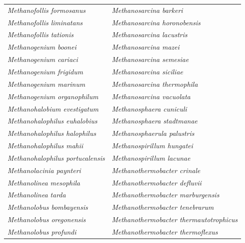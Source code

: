\documentclass[fontsize=12pt,headsepline=true, bibliography=totocnumbered, twoside]{scrbook} %
\begin{document}
\begin{table}[]
\small
\begin{tabular}{ll}
\textit{Methanofollis formosanus}         & \textit{Methanosarcina barkeri}                   \\
\textit{Methanofollis liminatans}         & \textit{Methanosarcina horonobensis}              \\
\textit{Methanofollis tationis}           & \textit{Methanosarcina lacustris}                 \\
\textit{Methanogenium boonei}             & \textit{Methanosarcina mazei}                     \\
\textit{Methanogenium cariaci}            & \textit{Methanosarcina semesiae}                  \\
\textit{Methanogenium frigidum}           & \textit{Methanosarcina siciliae}                  \\
\textit{Methanogenium marinum}            & \textit{Methanosarcina thermophila}               \\
\textit{Methanogenium organophilum}       & \textit{Methanosarcina vacuolata}                 \\
\textit{Methanohalobium evestigatum}      & \textit{Methanosphaera cuniculi}                  \\
\textit{Methanohalophilus euhalobius}     & \textit{Methanosphaera stadtmanae}                \\
\textit{Methanohalophilus halophilus}     & \textit{Methanosphaerula palustris}               \\
\textit{Methanohalophilus mahii}          & \textit{Methanospirillum hungatei}                \\
\textit{Methanohalophilus portucalensis}  & \textit{Methanospirillum lacunae}                 \\
\textit{Methanolacinia paynteri}          & \textit{Methanothermobacter crinale}              \\
\textit{Methanolinea mesophila}           & \textit{Methanothermobacter defluvii}             \\
\textit{Methanolinea tarda}               & \textit{Methanothermobacter marburgensis}         \\
\textit{Methanolobus bombayensis}         & \textit{Methanothermobacter tenebrarum}           \\
\textit{Methanolobus oregonensis}         & \textit{Methanothermobacter thermautotrophicus}   \\
\textit{Methanolobus profundi}            & \textit{Methanothermobacter thermoflexus}         \\

\end{tabular}
\end{table}
\end{document}
